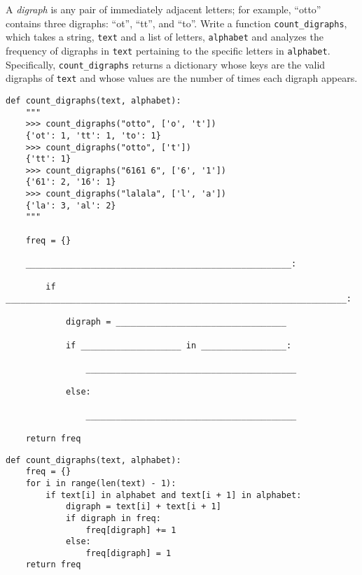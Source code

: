 \begin{blocksection}
\question A \textit{digraph} is any pair of immediately adjacent letters; for example, ``otto'' contains three digraphs: ``ot'', ``tt'', and ``to''. Write a function \lstinline{count_digraphs}, which takes a string, \lstinline{text} and a list of letters, \lstinline{alphabet} and analyzes the frequency of digraphs in \lstinline{text} pertaining to the specific letters in \lstinline{alphabet}. Specifically, \lstinline{count_digraphs} returns a dictionary whose keys are the valid digraphs of \lstinline{text} and whose values are the number of times each digraph appears.

\begin{lstlisting}
def count_digraphs(text, alphabet):
    """
    >>> count_digraphs("otto", ['o', 't'])
    {'ot': 1, 'tt': 1, 'to': 1}
    >>> count_digraphs("otto", ['t'])
    {'tt': 1}
    >>> count_digraphs("6161 6", ['6', '1'])
    {'61': 2, '16': 1}
    >>> count_digraphs("lalala", ['l', 'a'])
    {'la': 3, 'al': 2}
    """

    freq = {}

    _____________________________________________________:

        if ____________________________________________________________________:

            digraph = __________________________________

            if ____________________ in _________________:

                __________________________________________

            else:

                __________________________________________

    return freq
\end{lstlisting}
\end{blocksection}
\begin{solution}
\begin{lstlisting}
def count_digraphs(text, alphabet):
    freq = {}
    for i in range(len(text) - 1):
        if text[i] in alphabet and text[i + 1] in alphabet:
            digraph = text[i] + text[i + 1]
            if digraph in freq:
                freq[digraph] += 1
            else: 
                freq[digraph] = 1
    return freq
\end{lstlisting}
\end{solution}

